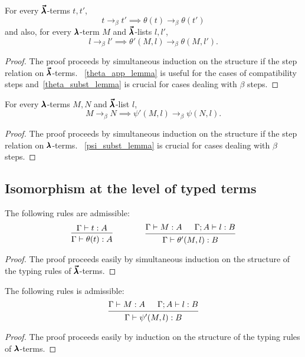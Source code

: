\begin{theorem}
  \label{theorem9}
  For every $\pmb{\vec \lambda}$-terms $t, t'$,
  \[ t \to_{\beta} t' \implies \theta(t) \to_{\beta} \theta(t') \]
  and also, for every $\pmb{\lambda}$-term $M$ and $\pmb{\vec \lambda}$-lists $l, l'$,
  \[ l \to_{\beta} l' \implies \theta'(M, l) \to_{\beta} \theta(M, l'). \]
\end{theorem}
\begin{proof}
  The proof proceeds by simultaneous induction on the structure if the step relation on $\pmb{\vec \lambda}$-terms.
  ~\cref{theta_app_lemma} is useful for the cases of compatibility steps and~\cref{theta_subst_lemma} is crucial for cases dealing with $\beta$ steps.
\end{proof}


\begin{theorem}
  \label{theorem10}
  For every $\pmb{\lambda}$-terms $M, N$ and $\pmb{\vec \lambda}$-list $l$,
  \[ M \to_{\beta} N \implies \psi'(M, l) \to_{\beta} \psi(N, l). \]
\end{theorem}
\begin{proof}
  The proof proceeds by simultaneous induction on the structure if the step relation on $\pmb{\lambda}$-terms.
  ~\cref{psi_subst_lemma} is crucial for cases dealing with $\beta$ steps.
\end{proof}

\subsection{Isomorphism at the level of typed terms}

\begin{theorem}
  \label{theorem11}
  The following rules are admissible:
  \[ \begin{prooftree}
      \hypo{ \Gamma \vdash t : A }
      \infer1{ \Gamma \vdash \theta(t) : A } 
    \end{prooftree}
    \qquad \qquad
    \begin{prooftree}
      \hypo{ \Gamma \vdash M : A }
      \hypo{ \Gamma ; A \vdash l : B }
      \infer2{ \Gamma \vdash \theta'(M, l) : B }.
    \end{prooftree} \]
\end{theorem}
\begin{proof}
  The proof proceeds easily by simultaneous induction on the structure of the typing rules of $\pmb{\vec \lambda}$-terms.
\end{proof}

\begin{theorem}
  \label{theorem12}
  The following rules is admissible:
  \[ \begin{prooftree}
      \hypo{ \Gamma \vdash M : A }
      \hypo{ \Gamma ; A \vdash l : B }
      \infer2{ \Gamma \vdash \psi'(M, l) : B }.
    \end{prooftree} \]
\end{theorem}
\begin{proof}
  The proof proceeds easily by induction on the structure of the typing rules of $\pmb{\lambda}$-terms.
\end{proof}

